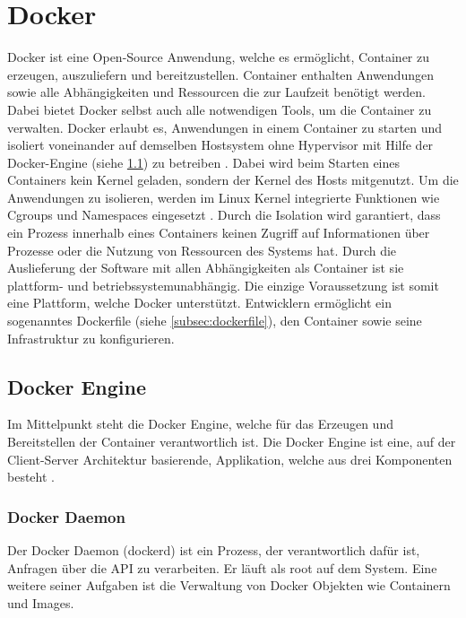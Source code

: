 \section{Docker}
\label{sec:Docker}
Docker ist eine Open-Source Anwendung, welche es ermöglicht, Container zu erzeugen, auszuliefern und bereitzustellen. Container enthalten Anwendungen sowie alle Abhängigkeiten und Ressourcen die zur Laufzeit benötigt werden. Dabei bietet Docker selbst auch alle notwendigen Tools, um die Container zu verwalten. Docker erlaubt es, Anwendungen in einem Container zu starten und isoliert voneinander auf demselben Hostsystem ohne Hypervisor mit Hilfe der Docker-Engine (siehe \ref{subsec:dockerengine}) zu betreiben \cite{DBLP:journals/corr/Bui15,Soltesz2007Container-basedHypervisors}. Dabei wird beim Starten eines Containers kein Kernel geladen, sondern der Kernel des Hosts mitgenutzt.
Um die Anwendungen zu isolieren, werden im Linux Kernel integrierte Funktionen wie Cgroups und Namespaces eingesetzt \cite{Anderson2015Docker}. Durch die Isolation wird garantiert, dass ein Prozess innerhalb eines Containers keinen Zugriff auf Informationen über Prozesse oder die Nutzung von Ressourcen des Systems hat.
Durch die Auslieferung der Software mit allen Abhängigkeiten als Container ist sie plattform- und betriebssystemunabhängig. Die einzige Voraussetzung ist somit eine Plattform, welche Docker unterstützt.
Entwicklern ermöglicht ein sogenanntes Dockerfile (siehe \ref{subsec:dockerfile}), den Container sowie seine Infrastruktur zu konfigurieren.

\subsection{Docker Engine}
\label{subsec:dockerengine}
Im Mittelpunkt steht die Docker Engine, welche für das Erzeugen und Bereitstellen der Container verantwortlich ist. Die Docker Engine ist eine, auf der Client-Server Architektur basierende, Applikation, welche aus drei Komponenten besteht \cite{doc:overview}.

\subsubsection{Docker Daemon}
\label{subsubsec:dockerdeamon}
Der Docker Daemon (dockerd) ist ein Prozess, der verantwortlich dafür ist, Anfragen über die API zu verarbeiten. Er läuft als root auf dem System. Eine weitere seiner Aufgaben ist die Verwaltung von Docker Objekten wie Containern und Images.

